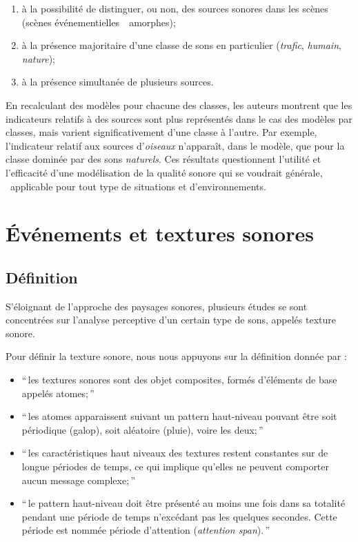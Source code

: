 \begin{enumerate}
\item à la possibilité de distinguer, ou non, des sources sonores dans les scènes (scènes événementielles~\vs~amorphes);
\item  à la présence majoritaire d'une classe de sons en particulier (\emph{trafic}, \emph{humain}, \emph{nature});
\item à la présence simultanée de plusieurs sources.
\end{enumerate}

En recalculant des modèles pour chacune des classes, les auteurs montrent que les indicateurs relatifs à des sources sont plus représentés dans le cas des modèles par classes, mais varient significativement d'une classe à l'autre. Par exemple, l’indicateur relatif aux sources d'\emph{oiseaux} n'apparaît, dans le modèle, que pour la classe dominée par des sons \emph{naturels}. Ces résultats questionnent l'utilité et l'efficacité d'une modélisation de la qualité sonore qui se voudrait générale, \ie~applicable pour tout type de situations et d'environnements.


\section{Événements et textures sonores}
\label{sec:ch3_eventTexture}

\subsection{Définition}
\label{sec:ch3_textureDef}

S'éloignant de l'approche des paysages sonores, plusieurs études se sont concentrées sur l'analyse perceptive d'un certain type de sons, appelés texture sonore.

Pour définir la texture sonore, nous nous appuyons sur la définition donnée par \citep[p. 25]{saint1995classification}:  

\begin{itemize}
\item ``\,les textures sonores sont des objet composites, formés d'éléments de base appelés atomes;\,''
\item ``\,les atomes apparaissent suivant un pattern haut-niveau pouvant être soit périodique (galop), soit aléatoire (pluie), voire les deux;\,''
\item ``\,les caractéristiques haut niveaux des textures restent constantes sur de longue périodes de temps, ce qui implique qu'elles ne peuvent comporter aucun message complexe;\,''
\item ``\,le pattern haut-niveau doit être présenté au moins une fois dans sa totalité pendant une période de temps n’excédant pas les quelques secondes. Cette période est nommée période d'attention (\emph{attention span}).\,''
\end{itemize}

